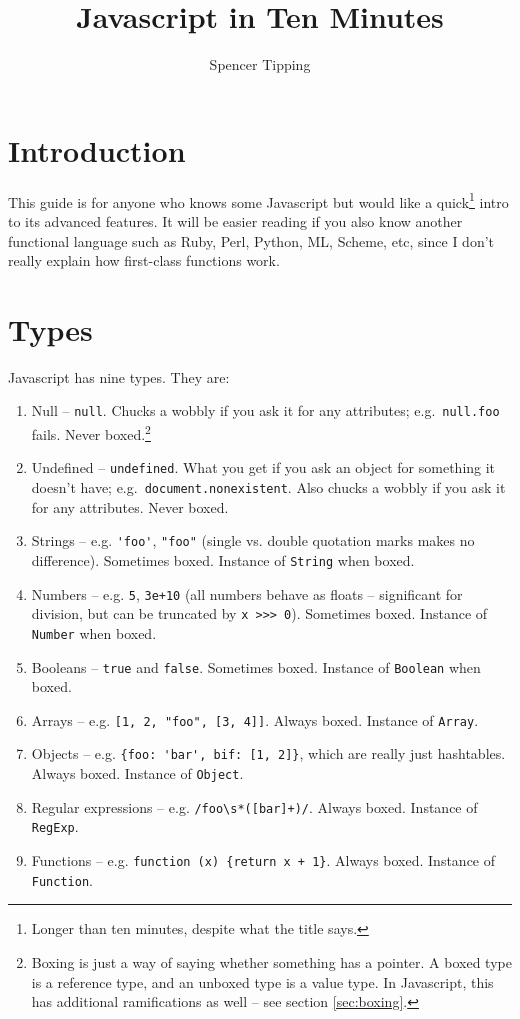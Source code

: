 \documentclass{article}
\title{Javascript in Ten Minutes}
\author{Spencer Tipping}
\begin{document}
\maketitle\tableofcontents

\newpage
\section {Introduction}
  This guide is for anyone who knows some Javascript but would like a quick\footnote{Longer than ten minutes, despite what the title says.} intro to its advanced features. It will be easier
  reading if you also know another functional language such as Ruby, Perl, Python, ML, Scheme, etc, since I don't really explain how first-class functions work.

\section {Types}
  Javascript has nine types. They are:

\begin{enumerate}
\item Null -- \verb|null|. Chucks a wobbly if you ask it for any attributes; e.g.~\verb|null.foo| fails. Never boxed.\footnote{Boxing is just a way of saying whether something has a pointer. A
      boxed type is a reference type, and an unboxed type is a value type. In Javascript, this has additional ramifications as well -- see section \ref{sec:boxing}.}
\item Undefined -- \verb|undefined|. What you get if you ask an object for something it doesn't have; e.g.~\verb|document.nonexistent|. Also chucks a wobbly if you ask it for any attributes.
      Never boxed.
\item Strings -- e.g. \verb|'foo'|, \verb|"foo"| (single vs. double quotation marks makes no difference). Sometimes boxed. Instance of \verb|String| when boxed.
\item Numbers -- e.g. \verb|5|, \verb|3e+10| (all numbers behave as floats -- significant for division, but can be truncated by \verb|x >>> 0|). Sometimes boxed. Instance of \verb|Number| when
      boxed.
\item Booleans -- \verb|true| and \verb|false|. Sometimes boxed. Instance of \verb|Boolean| when boxed.
\item Arrays -- e.g. \verb|[1, 2, "foo", [3, 4]]|. Always boxed. Instance of \verb|Array|.
\item Objects -- e.g. \verb|{foo: 'bar', bif: [1, 2]}|, which are really just hashtables. Always boxed. Instance of \verb|Object|.
\item Regular expressions -- e.g. \verb|/foo\s*([bar]+)/|. Always boxed. Instance of \verb|RegExp|.
\item Functions -- e.g. \verb|function (x) {return x + 1}|. Always boxed. Instance of \verb|Function|.
\end{enumerate}
\end{document}
